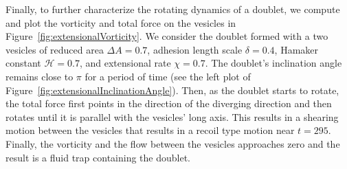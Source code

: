 \documentclass[prf,superscriptaddress,showpacs]{revtex4-1}
\begin{document}
Finally, to further characterize the rotating dynamics of a doublet, we
compute and plot the vorticity and total force on the vesicles in
Figure~\ref{fig:extensionalVorticity}. We consider the doublet formed
with a two vesicles of reduced area $\Delta A = 0.7$, adhesion length
scale $\delta = 0.4$, Hamaker constant $\mathcal{H} = 0.7$, and
extensional rate $\chi = 0.7$.  The doublet's inclination angle remains
close to $\pi$ for a period of time (see the left plot of
Figure~\ref{fig:extensionalInclinationAngle}).  Then, as the doublet
starts to rotate, the total force first points in the direction of the
diverging direction and then rotates until it is parallel with the
vesicles' long axis.  This results in a shearing motion between the
vesicles that results in a recoil type motion near $t=295$.  Finally,
the vorticity and the flow between the vesicles approaches zero and the
result is a fluid trap containing the doublet.
\end{document}
